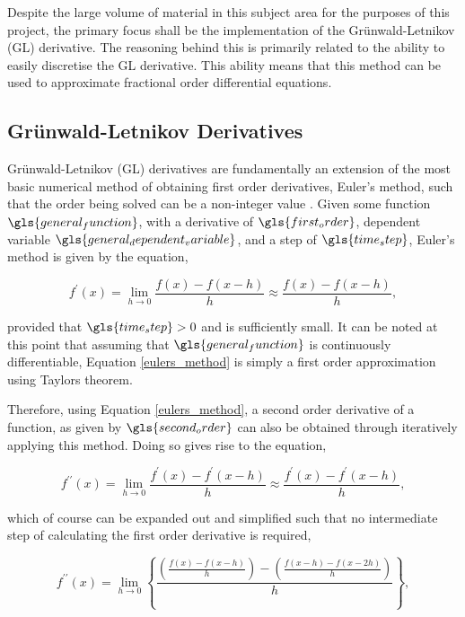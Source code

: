 Despite the large volume of material in this subject area for the purposes of this project, the primary focus shall be the implementation of the Gr\"{u}nwald-Letnikov (GL) derivative. The reasoning behind this is primarily related to the ability to easily discretise the GL derivative. This ability means that this method can be used to approximate fractional order differential equations.

\subsection{Gr\"{u}nwald-Letnikov Derivatives} \label{gl_derivatives}

Gr\"{u}nwald-Letnikov (GL) derivatives are fundamentally an extension of the most basic numerical method of obtaining first order derivatives, Euler's method, such that the order being solved can be a non-integer value \cite{the_fractional_calculus, euler1794institutiones}. Given some function $\gls{general_function}$, with a derivative of $\gls{first_order}$, dependent variable $\gls{general_dependent_variable}$, and a step of $\gls{time_step}$, Euler's method is given by the equation,

\begin{equation}\label{eulers_method}
	f^{\prime}(x) = \lim_{h \to 0} \frac{f(x)-f(x-h)}{h} \approx \frac{f(x)-f(x-h)}{h},
\end{equation} 

provided that $\gls{time_step} > 0$ and is sufficiently small. It can be noted at this point that assuming that $\gls{general_function}$ is continuously differentiable, Equation \ref{eulers_method} is simply a first order approximation using Taylors theorem. 

Therefore, using Equation \ref{eulers_method}, a second order derivative of a function, as given by $\gls{second_order}$ can also be obtained through iteratively applying this method. Doing so gives rise to the equation,

\begin{equation}\label{second_order}
	f^{\prime\prime}(x)= \lim_{h \to 0} \frac{f^{\prime}(x)-f^{\prime}(x-h)}{h} \approx \frac{f^{\prime}(x)-f^{\prime}(x-h)}{h},
\end{equation}

which of course can be expanded out and simplified such that no intermediate step of calculating the first order derivative is required,

\begin{equation}\label{second_order_expanded}
	f^{\prime\prime}(x) = \lim_{h \to 0} \left\{\frac{\left(\frac{f(x)-f(x-h)}{h}\right)-\left(\frac{f(x-h)-f(x-2h)}{h}\right)}{h}\right\},
\end{equation}

